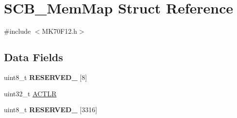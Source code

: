 \hypertarget{struct_s_c_b___mem_map}{}\section{S\+C\+B\+\_\+\+Mem\+Map Struct Reference}
\label{struct_s_c_b___mem_map}


{\ttfamily \#include $<$M\+K70\+F12.\+h$>$}

\subsection*{Data Fields}
\begin{DoxyCompactItemize}
\item 
\hypertarget{struct_s_c_b___mem_map_ad1b50f88903f5b63f2b92b7195511d00}{}uint8\+\_\+t {\bfseries R\+E\+S\+E\+R\+V\+E\+D\+\_} \mbox{[}8\mbox{]}\label{struct_s_c_b___mem_map_ad1b50f88903f5b63f2b92b7195511d00}

\item 
uint32\+\_\+t \hyperlink{struct_s_c_b___mem_map_a474a33074611146734690e48ed41282e}{A\+C\+T\+L\+R}
\item 
\hypertarget{struct_s_c_b___mem_map_ab112bcf2a89a8f23d7c0a9f7c2ba687b}{}uint8\+\_\+t {\bfseries R\+E\+S\+E\+R\+V\+E\+D\+\_} \mbox{[}3316\mbox{]}\label{struct_s_c_b___mem_map_ab112bcf2a89a8f23d7c0a9f7c2ba687b}


\end{DoxyCompactItemize}

